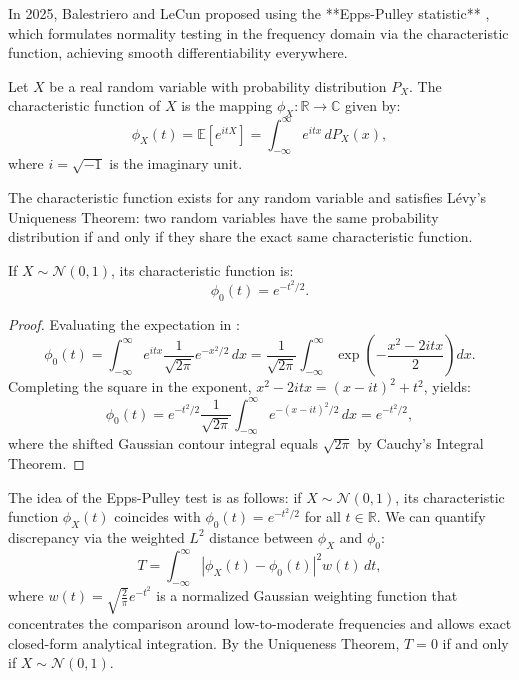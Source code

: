 \documentclass[11pt, oneside, openany]{book}
\begin{document}
In 2025, Balestriero and LeCun \cite{balestriero2025lejepa} proposed using the **Epps-Pulley statistic** \cite{epps1983test}, which formulates normality testing in the frequency domain via the characteristic function, achieving smooth differentiability everywhere.

\begin{definition}
\label{def:7.2}
Let $X$ be a real random variable with probability distribution $P_{X}$. The characteristic function of $X$ is the mapping $\phi_{X} \colon \mathbb{R} \to \mathbb{C}$ given by:
\begin{equation}
\label{eq:7.2}
\phi_{X}(t) = \mathbb{E}\left[e^{itX}\right] = \int_{-\infty}^{\infty} e^{itx}\,dP_{X}(x),
\end{equation}
where $i = \sqrt{-1}$ is the imaginary unit.
\end{definition}

The characteristic function exists for any random variable and satisfies L\'evy's Uniqueness Theorem: two random variables have the same probability distribution if and only if they share the exact same characteristic function.

\begin{proposition}
\label{prop:7.3}
If $X \sim \mathcal{N}(0, 1)$, its characteristic function is:
\begin{equation}
\label{eq:7.3}
\phi_{0}(t) = e^{-t^{2}/2}.
\end{equation}
\end{proposition}

\begin{proof}
Evaluating the expectation in :
\[
\phi_{0}(t) = \int_{-\infty}^{\infty} e^{itx} \frac{1}{\sqrt{2\pi}} e^{-x^{2}/2}\,dx = \frac{1}{\sqrt{2\pi}} \int_{-\infty}^{\infty} \exp\left( -\frac{x^{2} - 2itx}{2} \right) dx.
\]
Completing the square in the exponent, $x^{2} - 2itx = (x - it)^{2} + t^{2}$, yields:
\[
\phi_{0}(t) = e^{-t^{2}/2} \frac{1}{\sqrt{2\pi}} \int_{-\infty}^{\infty} e^{-(x - it)^{2}/2}\,dx = e^{-t^{2}/2},
\]
where the shifted Gaussian contour integral equals $\sqrt{2\pi}$ by Cauchy's Integral Theorem.
\end{proof}

The idea of the Epps-Pulley test is as follows: if $X \sim \mathcal{N}(0, 1)$, its characteristic function $\phi_{X}(t)$ coincides with $\phi_{0}(t) = e^{-t^{2}/2}$ for all $t \in \mathbb{R}$. We can quantify discrepancy via the weighted $L^{2}$ distance between $\phi_{X}$ and $\phi_{0}$:
\begin{equation}
\label{eq:7.4}
T = \int_{-\infty}^{\infty} \left\lvert \phi_{X}(t) - \phi_{0}(t) \right\rvert^{2} w(t)\,dt,
\end{equation}
where $w(t) = \sqrt{\frac{2}{\pi}} e^{-t^{2}}$ is a normalized Gaussian weighting function that concentrates the comparison around low-to-moderate frequencies and allows exact closed-form analytical integration. By the Uniqueness Theorem, $T = 0$ if and only if $X \sim \mathcal{N}(0, 1)$.
\end{document}
